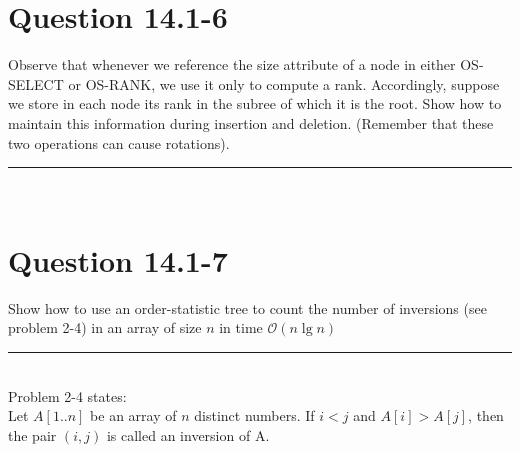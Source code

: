 \documentclass[20pt]{article} %
\begin{document}
\section{Question 14.1-6}
Observe that whenever we reference the size attribute of a node in either OS-SELECT or OS-RANK, we use it only to compute a rank.  Accordingly, suppose we store in each node its rank in the subree of which it is the root. Show how to maintain this information during insertion and deletion. (Remember that these two operations can cause rotations). \\
\noindent\rule{2cm}{0.4pt} \\


\section{Question 14.1-7}
Show how to use an order-statistic tree to count the number of inversions (see problem 2-4) in an array of size $n$ in time $\mathcal{O}(n \lg n)$  \\ 
\noindent\rule{2cm}{0.4pt} \\

Problem 2-4 states: \\
Let $A[1..n]$ be an array of $n$ distinct numbers. If $i < j$ and $A[i] > A[j]$, then the pair $(i,j)$ is called an inversion of A. \\ \\
\end{document}
